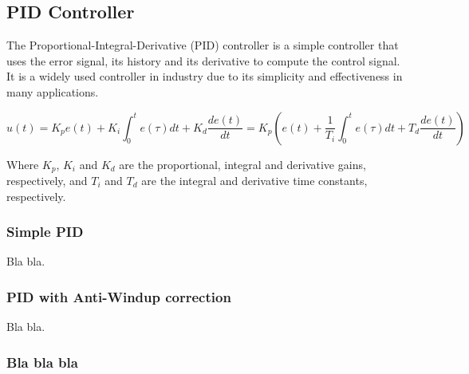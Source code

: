 \subsection{PID Controller}
\label{subsec:pid}

The Proportional-Integral-Derivative (PID) controller is a simple controller that uses the error signal, its history and its derivative to compute the control signal. It is a widely used controller in industry due to its simplicity and effectiveness in many applications.

\begin{equation}
    u(t) = K_p e(t) + K_i \int_{0}^{t} e(\tau)dt + K_d \frac{de(t)}{dt} = K_p \left(e(t) + \frac{1}{T_i} \int_{0}^{t} e(\tau)dt + T_d \frac{de(t)}{dt}\right)
\end{equation}

Where $K_p$, $K_i$ and $K_d$ are the proportional, integral and derivative gains, respectively, and $T_i$ and $T_d$ are the integral and derivative time constants, respectively.


\subsubsection{Simple PID}
\label{subsubsec:simple_pid}

Bla bla.

\subsubsection{PID with Anti-Windup correction}
\label{subsubsec:pid_anti_windup}

Bla bla.

\subsubsection{Bla bla bla}